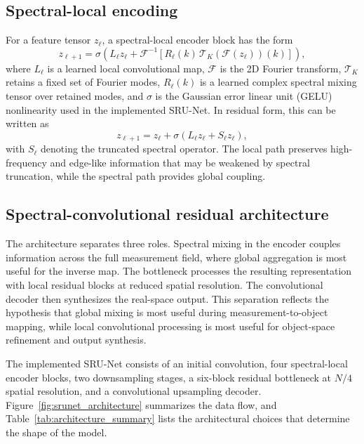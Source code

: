 \documentclass[11pt]{article}
\begin{document}
\subsection{Spectral-local encoding}

For a feature tensor $z_{\ell}$, a spectral-local encoder block has the form
\begin{equation}
z_{\ell+1}
= \sigma\left(
L_{\ell} z_{\ell}
+ \mathcal{F}^{-1}
\left[
R_{\ell}(k)\,\mathcal{T}_{K}\left(\mathcal{F}(z_{\ell})\right)(k)
\right]
\right),
\end{equation}
where $L_{\ell}$ is a learned local convolutional map, $\mathcal{F}$ is the 2D
Fourier transform, $\mathcal{T}_{K}$ retains a fixed set of Fourier modes,
$R_{\ell}(k)$ is a learned complex spectral mixing tensor over retained modes,
and $\sigma$ is the Gaussian error linear unit (GELU) nonlinearity \cite{gelu}
used in the implemented SRU-Net. In residual form, this can be written as
\begin{equation}
z_{\ell+1}
= z_{\ell} + \sigma\left(L_{\ell} z_{\ell} + S_{\ell} z_{\ell}\right),
\end{equation}
with $S_{\ell}$ denoting the truncated spectral operator. The local path
preserves high-frequency and edge-like information that may be weakened by
spectral truncation, while the spectral path provides global coupling.

\subsection{Spectral-convolutional residual architecture}

The architecture separates three roles. Spectral mixing in the encoder couples
information across the full measurement field, where global aggregation is most
useful for the inverse map. The bottleneck processes the resulting
representation with local residual blocks at reduced spatial resolution. The
convolutional decoder then synthesizes the real-space output. This separation
reflects the hypothesis that global mixing is most useful during
measurement-to-object mapping, while local convolutional processing is most
useful for object-space refinement and output synthesis.

The implemented SRU-Net consists of an initial convolution, four spectral-local
encoder blocks, two downsampling stages, a
six-block residual bottleneck at $N/4$ spatial resolution, and a convolutional
upsampling decoder. Figure~\ref{fig:srunet_architecture} summarizes the data flow, and
Table~\ref{tab:architecture_summary} lists the architectural choices that
determine the shape of the model.
\end{document}
